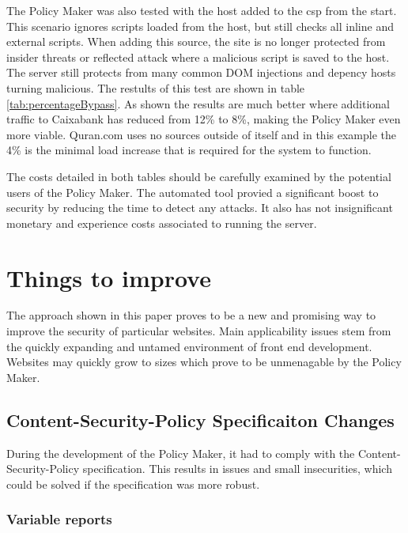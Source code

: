 The Policy Maker was also tested with the host added to the csp from the start.
This scenario ignores scripts loaded from the host, but still checks all inline and external scripts.
When adding this source, the site is no longer protected from insider threats or reflected attack where a malicious script is saved to the host.
The server still protects from many common DOM injections and depency hosts turning malicious.
The restults of this test are shown in table \ref{tab:percentageBypass}.
As shown the results are much better where additional traffic to Caixabank has reduced from 12\% to 8\%, making the Policy Maker even more viable.
Quran.com uses no sources outside of itself and in this example the 4\% is the minimal load increase that is required for the system to function.


The costs detailed in both tables should be carefully examined by the potential users of the Policy Maker.
The automated tool provied a significant boost to security by reducing the time to detect any attacks.
It also has not insignificant monetary and experience costs associated to running the server.


\section{Things to improve}

The approach shown in this paper proves to be a new and promising way to improve the security of particular websites.
Main applicability issues stem from the quickly expanding and untamed environment of front end development.
Websites may quickly grow to sizes which prove to be unmenagable by the Policy Maker.

\subsection{Content-Security-Policy Specificaiton Changes}

During the development of the Policy Maker, it had to comply with the Content-Security-Policy specification.
This results in issues and small insecurities, which could be solved if the specification was more robust.

\subsubsection{Variable reports}

